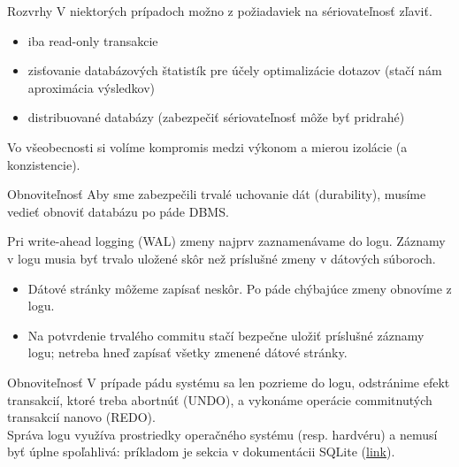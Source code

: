 \documentclass[12pt]{beamer}
\begin{document}
\begin{frame}[fragile]{Rozvrhy}
V niektorých prípadoch možno z požiadaviek na sériovateľnosť zľaviť.
\begin{itemize}
\item iba read-only transakcie
\item zisťovanie databázových štatistík pre účely optimalizácie dotazov (stačí nám aproximácia výsledkov)
\item distribuované databázy (zabezpečiť sériovateľnosť môže byť pridrahé)
\end{itemize}
Vo všeobecnosti si volíme kompromis medzi výkonom a mierou izolácie (a konzistencie).
\end{frame}


\begin{frame}[fragile]{Obnoviteľnosť}
Aby sme zabezpečili trvalé uchovanie dát (durability), musíme vedieť obnoviť databázu po páde DBMS.

Pri \alert{write-ahead logging} (WAL) zmeny najprv zaznamenávame do logu.
\alert{Záznamy v logu musia byť trvalo uložené skôr než príslušné zmeny v dátových súboroch.}

\begin{itemize}
\item Dátové stránky môžeme zapísať neskôr. Po páde chýbajúce zmeny obnovíme z logu.
\item Na potvrdenie trvalého commitu stačí bezpečne uložiť príslušné záznamy logu;
netreba hneď zapísať všetky zmenené dátové stránky.
\end{itemize}
\end{frame}


\begin{frame}[fragile]{Obnoviteľnosť}
V prípade pádu systému sa len pozrieme do logu,
odstránime efekt transakcií, ktoré treba abortnúť (UNDO), a vykonáme operácie commitnutých transakcií nanovo (REDO).
\\[3mm]

Správa logu využíva prostriedky operačného systému (resp. hardvéru) a nemusí byť úplne spoľahlivá: príkladom je sekcia
 v dokumentácii SQLite
(\href{https://www.sqlite.org/lockingv3.html#rollback}{link}).
\end{frame}
\end{document}
